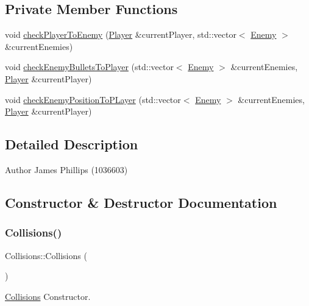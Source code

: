\subsection*{Private Member Functions}
\begin{DoxyCompactItemize}
\item 
void \hyperlink{class_collisions_a5c4cd9f8f690d0ba92fe5aabfb8d88fa}{check\+Player\+To\+Enemy} (\hyperlink{class_player}{Player} \&current\+Player, std\+::vector$<$ \hyperlink{class_enemy}{Enemy} $>$ \&current\+Enemies)
\item 
void \hyperlink{class_collisions_a421f805635d151a14481d5993fa3e9dc}{check\+Enemy\+Bullets\+To\+Player} (std\+::vector$<$ \hyperlink{class_enemy}{Enemy} $>$ \&current\+Enemies, \hyperlink{class_player}{Player} \&current\+Player)
\item 
void \hyperlink{class_collisions_a7ea0eaf049794a750a9115ff47eb3c45}{check\+Enemy\+Position\+To\+P\+Layer} (std\+::vector$<$ \hyperlink{class_enemy}{Enemy} $>$ \&current\+Enemies, \hyperlink{class_player}{Player} \&current\+Player)
\end{DoxyCompactItemize}


\subsection{Detailed Description}
\begin{DoxyAuthor}{Author}
James Phillips (1036603) 
\end{DoxyAuthor}


\subsection{Constructor \& Destructor Documentation}
\mbox{\label{class_collisions_a006630da4b62b10ebf123c6333c2b198}} 
\subsubsection{\texorpdfstring{Collisions()}{Collisions()}}
{\footnotesize\ttfamily Collisions\+::\+Collisions (\begin{DoxyParamCaption}{ }\end{DoxyParamCaption})}



\hyperlink{class_collisions}{Collisions} Constructor. 

